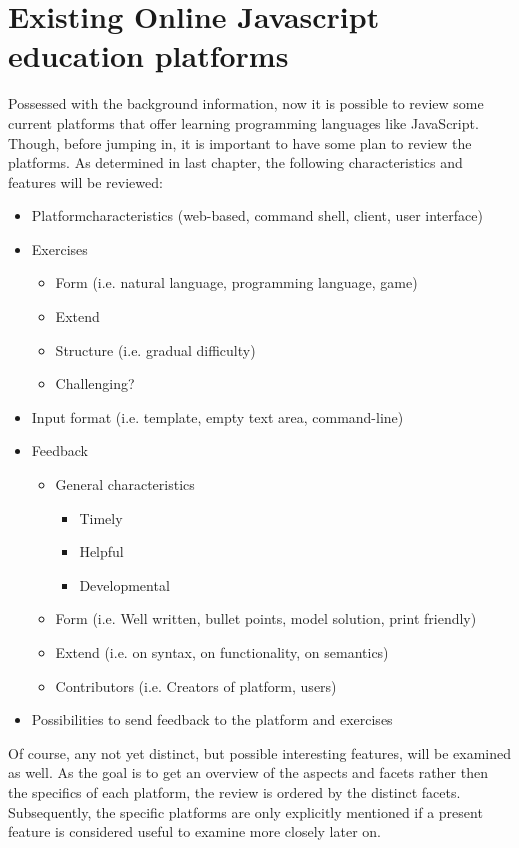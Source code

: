 \documentclass{article}
\begin{document}
\section{Existing Online Javascript education platforms} 
Possessed with the background information, now it is possible to
review some current platforms that offer learning programming languages like 
JavaScript. Though, before jumping in, it is important to have some plan to
review the platforms. As determined in last chapter, the following 
characteristics and features will be reviewed:
\begin{itemize}
  \item Platformcharacteristics (web-based, command shell, client, user interface)
  \item Exercises
    \begin{itemize}
      \item Form (i.e. natural language, programming language, game)
	  \item Extend
	  \item Structure (i.e. gradual difficulty)
	  \item Challenging?
    \end{itemize}
  \item Input format (i.e. template, empty text area, command-line)
  \item Feedback
    \begin{itemize}
	  \item General characteristics
	    \begin{itemize}
          \item Timely
	      \item Helpful
	      \item Developmental
        \end{itemize}
	  \item Form (i.e. Well written, bullet points, model solution, print friendly)
	  \item Extend (i.e. on syntax, on functionality, on semantics)
	  \item Contributors (i.e. Creators of platform, users)
	\end{itemize}
  \item Possibilities to send feedback to the platform and exercises
\end{itemize}

Of course, any not yet distinct, but possible interesting features, 
will be examined as well. As the goal is to get an overview of the aspects and
facets rather then the specifics of each platform, the review is ordered by 
the distinct facets. Subsequently, the specific platforms are only
explicitly mentioned if
a present feature is considered useful to examine more closely later on.
\end{document}
